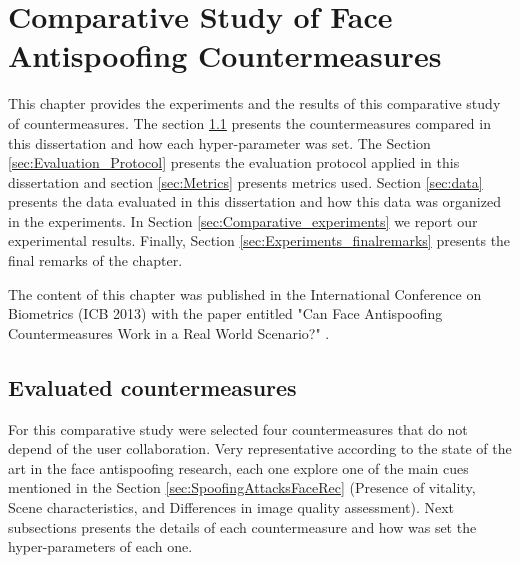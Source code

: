 \chapter{Comparative Study of Face Antispoofing Countermeasures}
\label{chap:Comparative_Study}

This chapter provides the experiments and the results of this comparative study of countermeasures. The section \ref{sec:Evaluated_countermeasures} presents the countermeasures compared in this dissertation and how each hyper-parameter was set. The Section \ref{sec:Evaluation_Protocol} presents the evaluation protocol applied in this dissertation and section \ref{sec:Metrics} presents metrics used. Section \ref{sec:data} presents the data evaluated in this dissertation and how this data was organized in the experiments. In Section \ref{sec:Comparative_experiments} we report our experimental results. Finally, Section \ref{sec:Experiments_finalremarks} presents the final remarks of the chapter.

The content of this chapter was published in the International Conference on Biometrics (ICB 2013) with the paper entitled "Can Face Antispoofing Countermeasures Work in a Real World Scenario?" \cite{FreitasPereira_ICB_2013}.



\section{Evaluated countermeasures}
\label{sec:Evaluated_countermeasures}

For this comparative study were selected four countermeasures that do not depend of the user collaboration. Very representative according to the state of the art in the face antispoofing research, each one explore one of the main cues mentioned in the Section \ref{sec:SpoofingAttacksFaceRec} (Presence of vitality, Scene characteristics, and Differences in image quality assessment). Next subsections presents the details of each countermeasure and how was set the hyper-parameters of each one.

